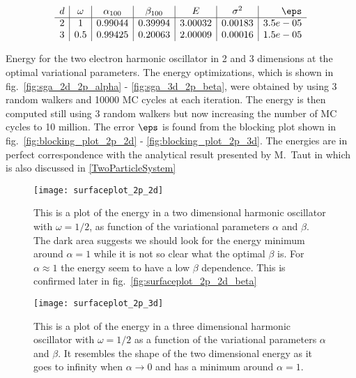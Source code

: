 \begin{table}[!h]
  \centering
  \[
  \begin{array}{c|c|c|c|c|c|r}
    d&\omega&\alpha_{100}&\beta_{100}&E&\sigma^2&\eps\\
    \hline
    2&1&0.99044&0.39994&3.00032&0.00183&3.5e-05\\
    3&0.5&0.99425 &0.20063&2.00009&0.00016&1.5e-05\\
  \end{array}
\]
\caption{Energy for the two electron harmonic oscillator in 2 and 3 dimensions at the optimal variational parameters. The energy optimizations, which is shown in fig.~\ref{fig:sga_2d_2p_alpha} - \ref{fig:sga_3d_2p_beta}, were obtained by using 3 random walkers and 10000 MC cycles at each iteration. The energy is then computed still using 3 random walkers but now increasing the number of MC cycles to 10 million. The error $\eps$ is found from the blocking plot shown in fig.~\ref{fig:blocking_plot_2p_2d} - \ref{fig:blocking_plot_2p_3d}. The energies are in perfect correspondence with the analytical result presented by M.~Taut in \cite{MTautQDotAnalSol} which is also discussed in \ref{TwoParticleSystem}} 
\label{table:OptimalParam2p}
\end{table}
\clearpage

\begin{figure}[!p]
  \begin{center}
    \texttt{[image: surfaceplot\_2p\_2d]}
  \end{center}
  \caption{This is a plot of the energy in a two dimensional harmonic oscillator with $\omega=1/2$, as function of the variational parameters $\alpha$ and $\beta$. The dark area suggests we should look for the energy minimum around $\alpha=1$ while it is not so clear what the optimal $\beta$ is. For $\alpha \approx 1$ the energy seem to have a low $\beta$ dependence. This is confirmed later in fig.~\ref{fig:surfaceplot_2p_2d_beta}}
  \label{fig:surfaceplot_2p_2d}
\end{figure}

\begin{figure}[!p]
  \begin{center}
    \texttt{[image: surfaceplot\_2p\_3d]}
  \end{center}
  \caption{This is a plot of the energy in a three dimensional harmonic oscillator with $\omega=1/2$ as a function of the variational parameters $\alpha$ and $\beta$. It resembles the shape of the two dimensional energy as it goes to infinity when $\alpha \rightarrow 0$ and has a minimum around $\alpha=1$.}
  \label{fig:surfaceplot_2p_3d}
\end{figure}

